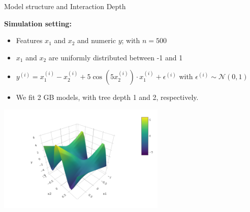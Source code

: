 \documentclass[11pt,compress,t,notes=noshow, xcolor=table]{beamer}
\begin{document}
\begin{vbframe}{Model structure and Interaction Depth}
\framebreak


\textbf{Simulation setting:}
\begin{itemize}
\item Features $x_1$ and $x_2$ and numeric $y$; with $n=500$
\item $x_1$ and $x_2$ are uniformly distributed between -1 and 1
\item $y^{(i)} = x_1^{(i)} -  x_2^{(i)} + 5\cos(5 x_2^{(i)}) \cdot x_1^{(i)} + \epsilon^{(i)}$ with $\epsilon^{(i)} \sim \mathcal{N}(0, 1)$
\item We fit 2 GB models, with tree depth 1 and 2, respectively. 
\end{itemize} 

\vfill

\begin{center}
\includegraphics[width=0.6\textwidth]{ figure_man/boosting_interaction_targetfunction3D.png}
\end{center}

\framebreak

% 


\end{vbframe}
\end{document}
